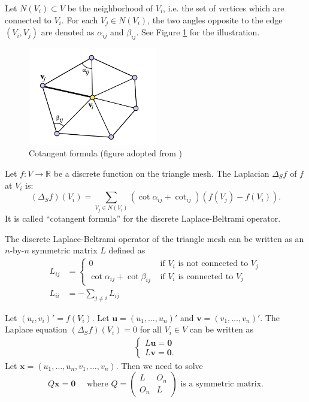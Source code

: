 \documentclass{article} %
\begin{document}
Let $N(V_i) \subset V$ be the neighborhood of $V_i$, i.e. the set of vertices which are connected to $V_i$. For each $V_j \in N(V_i)$, the two angles opposite to the edge $(V_i, V_j)$ are denoted as $\alpha_{ij}$ and $\beta_{ij}$. See Figure \ref{fig:cot} for the illustration. \begin{figure}[h!]
        \centering
        \includegraphics[width=0.5\textwidth]{cot.png}
        \caption{Cotangent formula (figure adopted from \cite{sorkine2005laplacian})}\label{fig:cot}
\end{figure}

Let $f: V \rightarrow \mathbb{R}$ be a discrete function on the triangle mesh. The Laplacian $\Delta_S f$ of $f$ at $V_i$ is:
$$
(\Delta_S f)(V_i) = \sum_{V_j \in N(V_i)} ( \cot \alpha_{ij} + \cot_{ij} ) (f(V_j) - f(V_i)).
$$
It is called ``cotangent formula''\cite{pinkall1993computing} for the discrete Laplace-Beltrami operator.

The discrete Laplace-Beltrami operator of the triangle mesh can be written as an $n$-by-$n$ symmetric matrix $L$ defined as
\begin{align*}
L_{ij} & = 
\begin{cases}
0 & \text{ if } V_i \text{ is not connected to } V_j \\
\cot \alpha_{ij} + \cot \beta_{ij} & \text{ if } V_i \text{ is connected to } V_j
\end{cases} \\
L_{ii} & = - \sum_{j \neq i} L_{ij}
\end{align*}

Let $(u_i, v_i)' = f(V_i)$. Let $\mathbf{u} = (u_1, \dots, u_n)'$ and $\mathbf{v} = (v_1, \dots, v_n)'$. The Laplace equation $(\Delta_S f)(V_i) = 0$ for all $V_i \in V$ can be written as
\begin{align*}
\begin{cases}
L\mathbf{u} = \mathbf{0} \\
L\mathbf{v} = \mathbf{0}.
\end{cases}
\end{align*}
Let $\mathbf{x} =  (u_1, \dots, u_n, v_1, \dots, v_n )$. Then we need to solve
\[
Q \mathbf{x} = \mathbf{0} \quad \text{ where }
Q =
\begin{pmatrix}
L & O_n \\
O_n & L
\end{pmatrix}
\text{ is a symmetric matrix.}
\]
\end{document}
